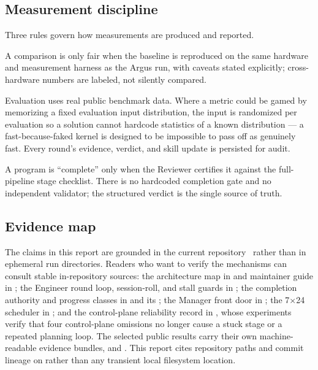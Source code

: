 \subsection{Measurement discipline}

Three rules govern how measurements are produced and reported.

\begin{description}[leftmargin=1.4em, style=nextline]
  \item[Same-hardware, same-harness baselines.] A comparison is only fair when the
    baseline is reproduced on the same hardware and measurement harness as the
    Argus run, with caveats stated explicitly; cross-hardware numbers are labeled,
    not silently compared.
  \item[Anti-cheat by construction.] Evaluation uses real public benchmark data.
    Where a metric could be gamed by memorizing a fixed evaluation input
    distribution, the input is randomized per evaluation so a solution cannot
    hardcode statistics of a known distribution --- a fast-because-faked kernel is
    designed to be impossible to pass off as genuinely fast. Every round's
    evidence, verdict, and skill update is persisted for audit.
  \item[Reviewer-certified completion.] A program is ``complete'' only when the
    Reviewer certifies it against the full-pipeline stage checklist. There is no
    hardcoded completion gate and no independent validator; the structured verdict
    is the single source of truth.
\end{description}

\subsection{Evidence map}

The claims in this report are grounded in the current 
repository~\cite{argus_repo} rather than in ephemeral run directories. Readers who
want to verify the mechanisms can consult stable in-repository sources: the
architecture map in  and maintainer guide in
; the Engineer round loop, session-roll, and stall guards in
; the completion authority and progress classes in
 and its ; the
Manager front door in ; the 7$\times$24 scheduler in
; and the control-plane reliability record in
, whose experiments verify
that four control-plane omissions no longer cause a stuck stage or a repeated
planning loop. The selected public results carry their own machine-readable
evidence bundles,  and
. This report cites repository paths and commit
lineage on  rather than any transient local filesystem location.
